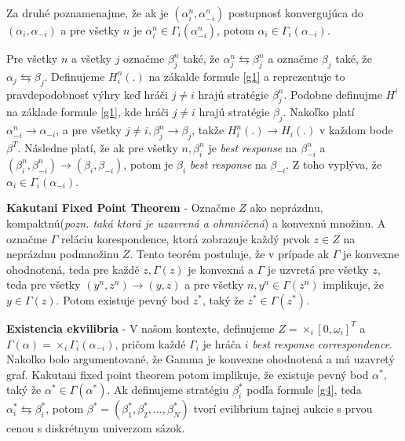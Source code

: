 \documentclass[a4paper, 11pt]{article}
\newenvironment{definition}[1][Definition]{\begin{trivlist}
\item[\hskip \labelsep {\bfseries #1}]}{\end{trivlist}}
\begin{document}
Za druhé poznamenajme, že ak je $(\alpha_{i}^{n},\alpha_{-i}^{n})$ postupnosť konvergujúca do $(\alpha_{i},\alpha_{-i})$ a pre všetky $n$ je $\alpha_{i}^{n} \in \Gamma_{i}(\alpha_{-i}^{n})$, potom $\alpha_{i} \in \Gamma_{i}(\alpha_{-i})$.

Pre všetky $n$ a všetky $j$ označme $\beta_{j}^{n}$ také, že $\alpha_{j}^{n} \leftrightarrows \beta_{j}^{n}$ a označme $\beta_{j}$ také, že $\alpha_{j} \leftrightarrows \beta_{j}$. Definujeme $H_{i}^{n}(.)$ na zákalde formule \ref{g1} a reprezentuje to pravdepodobnosť výhry keď hráči $j \ne i$ hrajú stratégie $\beta_{j}^{n}$. Podobne definujme $H^{i}$ na základe formule \ref{g1}, kde hráči $j \ne i$ hrajú stratégie $\beta_{j}$. Nakoľko platí $\alpha_{-i}^{n} \rightarrow \alpha_{-i}$, a pre všetky $j \ne i, \beta_{j}^{n} \rightarrow \beta_{j}$, takže $H_{i}^{n}(.) \rightarrow H_{i}(.)$ v každom bode $\beta^{T}$. Následne platí, že ak pre všetky $n, \beta_{i}^{n}$ je \textit{best response} na $\beta_{-i}^{n}$ a $(\beta_{i}^{n}, \beta_{-i}^{n}) \rightarrow (\beta_{i}, \beta_{-i})$, potom je $\beta_{i}$ \textit{best response} na $\beta_{-i}$. Z toho vyplýva, že $\alpha_{i} \in \Gamma_{i}(\alpha_{-i})$.

\begin{definition}
\textbf{Kakutani Fixed Point Theorem} - Označme $Z$ ako neprázdnu, kompaktnú(\textit{pozn. taká ktorá je uzavrená a ohraničená}) a konvexnú množinu. A označme $\Gamma$ reláciu korespondence, ktorá zobrazuje každý prvok $z \in Z$ na neprázdnu podmnožinu $Z$.  Tento teorém postuluje, že v prípade ak $\Gamma$ je konvexne ohodnotená, teda pre každě $z, \Gamma(z)$ je konvexná a $\Gamma$ je uzvretá pre všetky $z$, teda pre všetky $(y^{n},z^{n}) \rightarrow (y,z)$ a pre všetky $n, y^{n} \in \Gamma(z^{n})$ implikuje, že $y \in \Gamma(z)$. Potom existuje pevný bod $z^{*}$, taký že $z^{*} \in \Gamma(z^{*})$.
\end{definition}

\begin{definition}
\textbf{Existencia ekvilibria} - V našom kontexte, definujeme $Z = \times_{i}[0,\omega_{i}]^{T}$ a $\Gamma(\alpha) = \times_{i}\Gamma_{i}(\alpha_{-i})$, pričom každé $\Gamma_{i}$  je hráča $i$ \textit{best response correspondence}. Nakoľko bolo argumentované, že Gamma  je konvexne ohodnotená a má uzavretý graf. Kakutani fixed point theorem potom implikuje, že existuje pevný bod $\alpha^{*}$, taký že $\alpha^{*} \in \Gamma(\alpha^{*})$. Ak definujeme stratégiu $\beta_{i}^{*}$ podľa formule \ref{g4}, teda $\alpha_{i}^{*} \leftrightarrows \beta_{i}^{*}$, potom $\beta^{*} = (\beta_{1}^{*}, \beta_{2}^{*}, \dots, \beta_{N}^{*})$ tvorí evilibrium tajnej aukcie s prvou cenou s diskrétnym univerzom sázok.
\end{definition}
\end{document}
